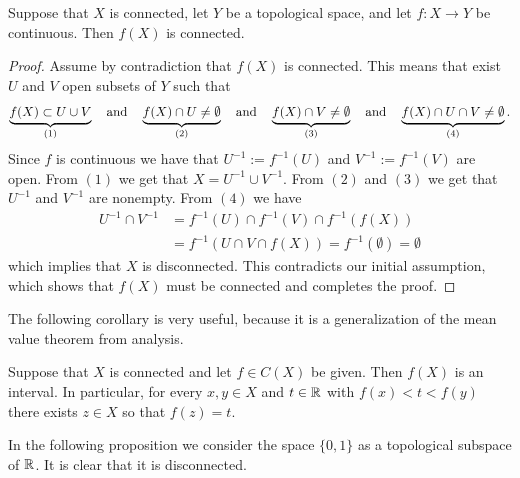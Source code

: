 \documentclass[11pt,a4paper]{article}
\begin{document}
\begin{proposition}\label{prp:connected-continuous}
  Suppose that $X$ is connected,
  let $Y$ be a topological space,
  and let $f \colon X \to Y$ be continuous.
  Then $f(X)$ is connected.
\end{proposition}
\begin{proof}
  Assume by contradiction that $f(X)$ is connected.
  This means that exist $U$ and $V$ open subsets of $Y$ such that
  \[
    \underbrace{f(X) \subset U \cup V}_{(1)} \quad \text{and} \quad
    \underbrace{f(X) \cap U \neq \emptyset}_{(2)} \quad \text{and} \quad
    \underbrace{f(X) \cap V \neq \emptyset}_{(3)} \quad \text{and} \quad
    \underbrace{f(X) \cap U \cap V \neq \emptyset}_{(4)}.
  \]
  Since $f$ is continuous we have that $U^{-1} := f^{-1}(U)$ and
  $V^{-1} := f^{-1}(V)$ are open.
  From $(1)$ we get that $X = U^{-1} \cup V^{-1}$.
  From $(2)$ and $(3)$ we get that $U^{-1}$ and $V^{-1}$ are nonempty.
  From $(4)$ we have
  \begin{align*}
    U^{-1} \cap V^{-1} &=
    f^{-1}(U) \cap f^{-1}(V) \cap f^{-1}(f(X)) \\
                       &= f^{-1}(U \cap V \cap f(X))
                        = f^{-1}(\emptyset) = \emptyset
  \end{align*}
  which implies that $X$ is disconnected.
  This contradicts our initial assumption,
  which shows that $f(X)$ must be connected and completes the proof.
\end{proof}

The following corollary is very useful, because it is a generalization
of the mean value theorem from analysis.

\begin{corollary}
  Suppose that $X$ is connected and let $f \in C(X)$ be given.
  Then $f(X)$ is an interval. In particular, for every $x, y \in X$ and 
  $t \in \mathbb{R}$ with $f(x) < t < f(y)$ there exists $z \in X$ so that $f(z) = t$.
\end{corollary}

In the following proposition we consider the space $\{0, 1\}$ as a topological
subspace of $\mathbb{R}$. It is clear that it is disconnected.
\end{document}
